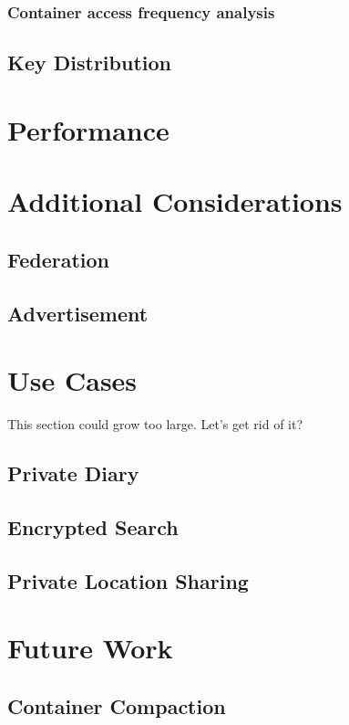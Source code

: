 \documentclass[conference]{IEEEtran}
\begin{document}
\subsubsection{Container access frequency analysis}

\subsection{Key Distribution}

\section{Performance}

\section{Additional Considerations}

\subsection{Federation}
\subsection{Advertisement}

\section{Use Cases}
This section could grow too large. Let's get rid of it?

\subsection{Private Diary}
\subsection{Encrypted Search}
\subsection{Private Location Sharing}

\section{Future Work}

\subsection{Container Compaction}
\end{document}
